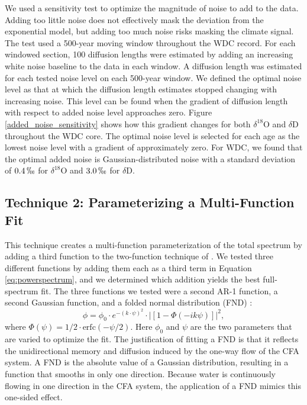 \documentclass[draft, jgrga]{AGUTeX}
\begin{document}
\begin{article}
We used a sensitivity test to optimize the magnitude of noise to add to the data. Adding too little noise does not effectively mask the deviation from the exponential model, but adding too much noise risks masking the climate signal. The test used a 500-year moving window throughout the WDC record. For each windowed section, 100 diffusion lengths were estimated by adding an increasing white noise baseline to the data in each window. A diffusion length was estimated for each tested noise level on each 500-year window. We defined the optimal noise level as that at which the diffusion length estimates stopped changing with increasing noise. This level can be found when the gradient of diffusion length with respect to added noise level approaches zero. Figure \ref{added_noise_sensitivity} shows how this gradient changes for both $\delta^{18}$O and $\delta$D throughout the WDC core. The optimal noise level is selected for each age as the lowest noise level with a gradient of approximately zero. For WDC, we found that the optimal added noise is Gaussian-distributed noise with a standard deviation of $0.4 \, \permil$ for $\delta^{18}$O and $3.0 \,\permil$ for $\delta$D.

\subsection{Technique 2: Parameterizing a Multi-Function Fit}
This technique creates a multi-function parameterization of the total spectrum by adding a third function to the two-function technique of \citet{Gkinis2014}. We tested three different functions by adding them each as a third term in Equation \ref{eq:powerspectrum}, and we determined which addition yields the best full-spectrum fit. The three functions we tested were a second AR-1 function, a second Gaussian function, and a folded normal distribution (FND) \citep{Tsagris2014}:
\begin{equation}
\phi = \phi_{0} \cdot e^{-(k \cdot \psi)^2} \cdot |\left[1 - \Phi(-i k \psi)\right]|^2,
\end{equation}
where $\Phi(\psi) = 1/2\cdot \mathrm{erfc}(-\psi/2) $. Here $\phi_0$ and $\psi$ are the two parameters that are varied to optimize the fit. The justification of fitting a FND is that it reflects the unidirectional memory and diffusion induced by the one-way flow of the CFA system. A FND is the absolute value of a Gaussian distribution, resulting in a function that smooths in only one direction. Because water is continuously flowing in one direction in the CFA system, the application of a FND mimics this one-sided effect.


\end{article}
\end{document}
